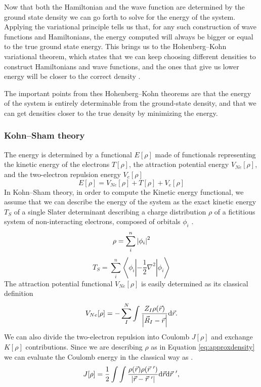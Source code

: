 \documentclass[../master_thesis.tex]{subfiles}
\begin{document}
Now that both the Hamiltonian and the wave function are determined by the ground
state density we can go forth to solve for the energy of the system. Applying the variational
principle tells us that, for any such construction of wave functions and Hamiltonians,
the energy computed will always be bigger or equal to the true ground state energy.
This brings us to the Hohenberg--Kohn variational theorem, which states that
we can keep choosing different densities to construct Hamiltonians and wave functions,
and the ones that give us lower energy will be closer to the correct density \cite{Cramer:2004}.

The important points from thes Hohenberg--Kohn theorems are that the energy of
the system is entirely determinable from the ground-state density, and that we can
get densities closer to the true density by minimizing the energy.
\subsubsection{Kohn--Sham theory}

The energy is determined by a functional $E[\rho]$ made of functionals representing
the kinetic energy of the electrons $T[\rho]$, the attraction potential energy $V_{Ne}[\rho]$,
and the two-electron repulsion energy $V_{e}[\rho]$ \cite{Sorland, PhysRev.136.B864}
\begin{equation}\label{eq:energyfunctional}
  E[\rho] = V_{Ne}[\rho] + T[\rho] + V_{e}[\rho]
\end{equation}
In Kohn--Sham theory, in order to compute the Kinetic energy functional, we assume
that we can describe the energy of the system as the exact kinetic energy  $T_S$ of a single Slater
determinant describing a charge distribution $\rho$ of a fictitious system of
non-interacting electrons, composed of orbitals $\phi_i$ \cite{Jensen:2017}.
\begin{equation}\label{eq:approxdensity}
    \rho = \sum^n_i \abs{\phi_i}^2
\end{equation}
\begin{equation}\label{eq:TS}
  T_S = \sum_{i}^n\left\langle\phi_i\left|-\frac{1}{2}\nabla^2\right|\phi_i\right\rangle
\end{equation}
The attraction potential functional $V_{Ne}[\rho]$ is easily determined as its classical definition \cite{Jensen:2017}
\begin{equation}
  V_{Ne}[\rho] = - \sum^N_I \int\frac{Z_I\rho(\vec{r})}{\abs{\vec{R}_I - \vec{r}}} \text{d}\vec{r}.
\end{equation}
We can also divide the two-electron repulsion into Coulomb $J[\rho]$ and exchange $K[\rho]$ contributions.
Since we are describing $\rho$ as in Equation \ref{eq:approxdensity} we can evaluate the
Coulomb energy in the classical way as \cite{Jensen:2017}.
\begin{equation}
  J[\rho] = \frac{1}{2}\int\int \frac{\rho(\vec{r})\rho(\vec{r}^{~\prime})}{\abs{\vec{r} - \vec{r}^{~\prime}}} \text{d}\vec{r}\text{d}\vec{r}^{~\prime},
\end{equation}
\end{document}
